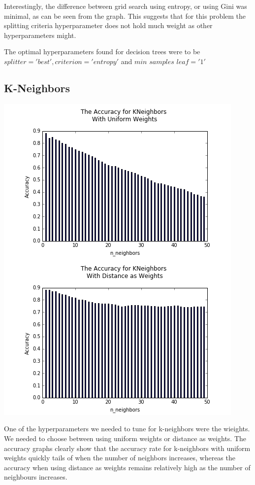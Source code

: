 \documentclass{article}
\begin{document}
Interestingly, the difference between grid search using entropy, or using Gini was minimal, as can be seen from the graph. This suggests that for this problem the splitting criteria hyperparameter does not hold much weight as other hyperparameters might. 

The optimal hyperparameters found for decision trees were to be $splitter = 'best', criterion = 'entropy'$ and $min$ \textunderscore $samples$ \textunderscore $leaf = '1'$

\subsection{K-Neighbors}

\includegraphics[scale=0.6]{k-nboors}

One of the hyperparameters we needed to tune for k-neighbors were the wieights. We needed to choose between using uniform weights or distance as weights. The accuracy graphs clearly show that the accuracy rate for k-neighbors with uniform weights quickly tails of when the number of neighbors increases, whereas the accuracy when using distance as weights remains relatively high as the number of neighbours increases. 
\end{document}
